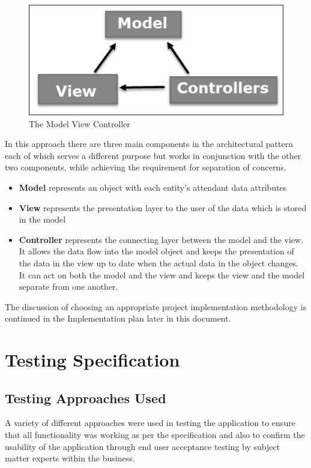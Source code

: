 \documentclass[a4paper,Times New Roman 11pt]{article}
\begin{document}
 \begin{figure}[h!]

\includegraphics{mvc.jpg}
  \caption{The Model View Controller}
  \label{fig:model view controller}
\end{figure}
In this approach there are three main components in the architectural pattern each of which serves a different purpose but works in conjunction with the other two components, while achieving the requirement for separation of concerns.

\begin{itemize}
\item \textbf{Model} represents an object with each entity's attendant data attributes 
\item \textbf{View} represents the presentation layer to the user of the data which is stored in the model
\item \textbf{Controller} represents the connecting layer between the model and the view. It allows the data flow into the model object and keeps the presentation of the data in the view up to date when the actual data in the object changes. It can act on both the model and the view and keeps the view and the model separate from one another.
\end{itemize}

The discussion of choosing an appropriate project implementation methodology is continued in the Implementation plan later in this document.

\newpage
\section {Testing Specification}
\subsection {Testing Approaches Used}

A variety of different approaches were used in testing the application to ensure that all functionality was working as per the specification and also to confirm the usability of the application through end user acceptance testing by subject matter experts within the business.
\end{document}
